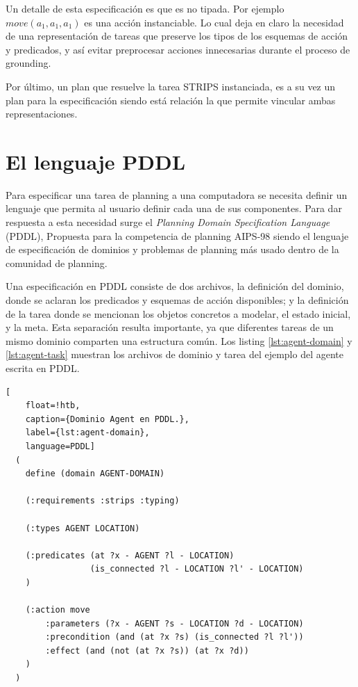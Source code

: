 Un detalle de esta especificación es que es no tipada. Por ejemplo $move(a_1,
a_1, a_1)$ es una acción instanciable. Lo cual deja en claro la necesidad de una
representación de tareas que preserve los tipos de los esquemas de acción y
predicados, y así evitar preprocesar acciones innecesarias durante el proceso de
grounding.

Por último, un plan que resuelve la tarea STRIPS instanciada, es a su vez un
plan para la especificación siendo está relación la que permite vincular ambas
representaciones.

\section{El lenguaje PDDL}

Para especificar una tarea de planning a una computadora se necesita definir un
lenguaje que permita al usuario definir cada una de sus componentes. Para dar
respuesta a esta necesidad surge el \emph{Planning Domain Specification
Language} (PDDL), Propuesta para la competencia de planning AIPS-98
\citep{McDermott1998} siendo el lenguaje de especificación de dominios y
problemas de planning más usado dentro de la comunidad de planning.

Una especificación en PDDL consiste de dos archivos, la definición del dominio,
donde se aclaran los predicados y esquemas de acción disponibles; y la
definición de la tarea donde se mencionan los objetos concretos a modelar, el
estado inicial, y la meta. Esta separación resulta importante, ya que diferentes
tareas de un mismo dominio comparten una estructura común. Los listing
\ref{lst:agent-domain} y \ref{lst:agent-task} muestran los archivos de dominio y
tarea del ejemplo del agente escrita en PDDL.

\begin{lstlisting}[
    float=!htb,
    caption={Dominio Agent en PDDL.},
    label={lst:agent-domain},
    language=PDDL]
  (
    define (domain AGENT-DOMAIN)

    (:requirements :strips :typing)

    (:types AGENT LOCATION)

    (:predicates (at ?x - AGENT ?l - LOCATION)
                 (is_connected ?l - LOCATION ?l' - LOCATION)
    )

    (:action move
        :parameters (?x - AGENT ?s - LOCATION ?d - LOCATION)
        :precondition (and (at ?x ?s) (is_connected ?l ?l'))
        :effect (and (not (at ?x ?s)) (at ?x ?d))
    )
  )
\end{lstlisting}

